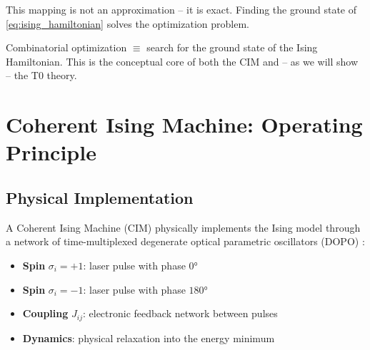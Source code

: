 \begin{table}[h]
    \centering
    \caption{Examples of the mapping of NP-hard problems onto Ising Hamiltonians}
    \label{tab:qubo_examples}
\end{table}

This mapping is not an approximation -- it is exact. Finding the ground state of
\eqref{eq:ising_hamiltonian} solves the optimization problem.

\begin{important}
    Combinatorial optimization $\equiv$ search for the ground state of the Ising
    Hamiltonian. This is the conceptual core of both the CIM and -- as we will show --
    the T0 theory.
\end{important}

\clearpage

\section{Coherent Ising Machine: Operating Principle}
\label{sec:cim}

\subsection{Physical Implementation}

A Coherent Ising Machine (CIM) physically implements the Ising model through a
network of time-multiplexed degenerate optical parametric oscillators (DOPO)
\cite{yamamoto_cim_2017, honjo_100k_cim_2021}:

\begin{itemize}
    \item \textbf{Spin} $\sigma_i = +1$: laser pulse with phase $0°$
    \item \textbf{Spin} $\sigma_i = -1$: laser pulse with phase $180°$
    \item \textbf{Coupling} $J_{ij}$: electronic feedback network between pulses
    \item \textbf{Dynamics}: physical relaxation into the energy minimum
\end{itemize}

